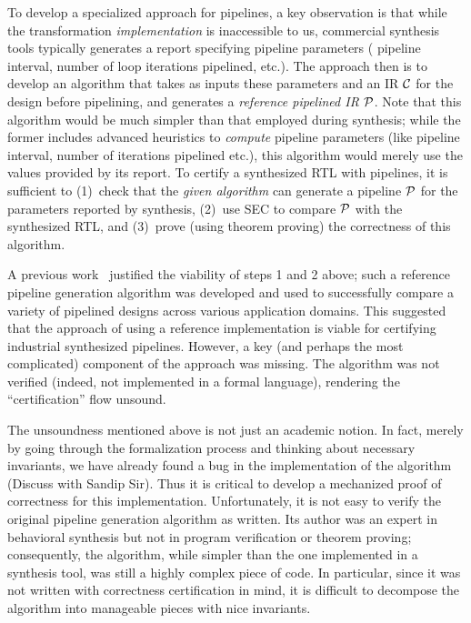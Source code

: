 To develop a specialized approach for pipelines, a key observation
is that while the transformation {\em implementation} is inaccessible
to us, commercial synthesis tools typically generates a report
specifying pipeline parameters (%
pipeline interval, number of loop
iterations pipelined, etc.).  The approach then is to develop an
algorithm that takes as inputs these parameters and an IR ${\cal{C}}$
for the design before pipelining, and generates a {\em reference
  pipelined IR} ${\cal{P}}$.  Note that this algorithm would be much simpler
than that employed during synthesis; while the former includes
advanced heuristics to {\em compute} pipeline parameters (like
pipeline interval, number of iterations pipelined etc.), this algorithm would merely use
the values provided by its report.  To certify a synthesized RTL with
pipelines, it is sufficient to (1)~check that the {\em given algorithm} can
generate a pipeline ${\cal{P}}$ for the parameters reported by
synthesis, (2)~use SEC to compare ${\cal{P}}$ with the synthesized
RTL, and (3)~prove (using theorem proving) the correctness of this
algorithm.

A previous work~\cite{hrx:dac-12} justified the viability of
steps 1 and 2 above; such a reference pipeline generation algorithm
was developed and used to successfully compare a variety of pipelined
designs across various application domains.  This suggested that the
approach of using a reference implementation is viable for certifying
industrial synthesized pipelines.  However, a key (and perhaps the
most complicated) component of the approach was missing.  The
algorithm was not verified (indeed, not implemented in a formal
language), rendering the ``certification'' flow unsound.

The unsoundness mentioned above is not just an academic notion.  In
fact, merely by going through the formalization process and thinking
about necessary invariants, we have already found a bug in
the implementation of the algorithm (Discuss with Sandip Sir).  
Thus it is critical to develop a mechanized proof of
correctness for this implementation.  Unfortunately, it is not easy to
verify the original pipeline generation algorithm as written.  Its
author was an expert in behavioral synthesis but not in program
verification or theorem proving; consequently, the algorithm, while
simpler than the one implemented in a synthesis tool, was still a highly
complex piece of code.  In particular, since it was not written with
correctness certification in mind, it is difficult to decompose the algorithm into
manageable pieces with nice invariants.

